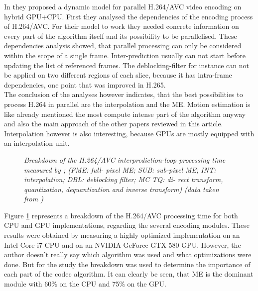 In \cite{Paper2} they proposed a dynamic model for parallel H.264/AVC video encoding on hybrid GPU+CPU. First they analysed the dependencies of the encoding process of H.264/AVC. For their model to work they needed concrete information on every part of the algorithm itself and its possibility to be parallelised. These dependencies analysis showed, that parallel processing can only be considered within the scope of a single frame. Inter-prediction usually can not start before updating the list of referenced frames. The deblocking-filter for instance can not be applied on two different regions of each slice, because it has intra-frame dependencies, one point that was improved in H.265. \\
The conclusion of the analyses however indicates, that the best possibilities to process H.264 in parallel are the interpolation and the ME. Motion estimation is like already mentioned the most compute intense part of the algorithm anyway and also the main approach of the other papers reviewed in this article. Interpolation however is also interesting, because GPUs are mostly equipped with an interpolation unit.\\

\begin{figure}[H]

\caption{\label{dynamic_cpu_gpu}{\it Breakdown of the H.264/AVC interprediction-loop processing time measured by \cite{Paper2}; (FME: full-
pixel ME; SUB: sub-pixel ME; INT: interpolation; DBL: deblocking filter; MC TQ: di-
rect transform, quantization, dequantization and inverse transform) (data taken from \cite{Paper2})}}
\end{figure}

Figure \ref{dynamic_cpu_gpu} represents a breakdown of the H.264/AVC processing time for both CPU and GPU implementations, regarding the several encoding modules. These results were obtained by measuring  a highly optimized implementation on an Intel Core i7 CPU and on an NVIDIA GeForce GTX 580 GPU. However, the author doesn't really say which algorithm was used and what optimizations were done. But for the study the breakdown was used to determine the importance of each part of the codec algorithm. It can clearly be seen, that ME is the dominant module with 60\% on the CPU and 75\% on the GPU.

